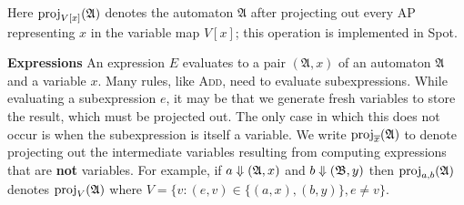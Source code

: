 Here $\text{proj}_{V[x]}(\mathfrak{A})$ denotes the automaton $\mathfrak{A}$ after projecting out every AP representing $x$ in the variable map $V[x]$; this operation is implemented in Spot.

\textbf{Expressions}
An expression $E$ evaluates to a pair $(\mathfrak{A}, x)$ of an automaton $\mathfrak{A}$ and a variable $x$.
Many rules, like \textsc{Add}, need to evaluate subexpressions.
While evaluating a subexpression $e$, it may be that we generate fresh variables to store the result, which must be projected out.
The only case in which this does not occur is when the subexpression is itself a variable.
We write $\text{proj}_{\overline{x}}(\mathfrak{A})$ to denote projecting out the intermediate variables resulting from computing expressions that are \textbf{not} variables.
For example, if $a \Downarrow (\mathfrak{A}, x)$ and $b \Downarrow (\mathfrak{B}, y)$ then $\text{proj}_{a,b}(\mathfrak{A})$ denotes $\text{proj}_V(\mathfrak{A})$ where $V = \{ v : (e, v) \in \{ (a,x), (b,y) \}, e \neq v \}$.

